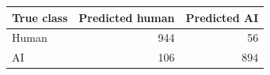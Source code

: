 \par\noindent
\begin{tabularx}{\linewidth}{@{}Yrr@{}}
\toprule
True class & Predicted human & Predicted AI \\
\midrule
Human & 944 & 56 \\
AI & 106 & 894 \\
\bottomrule
\end{tabularx}
\par
